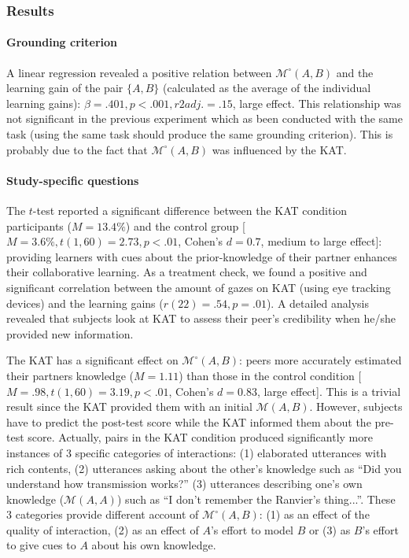 \documentclass[natbib]{svjour3}
\newcommand{\gmodel}[2]{{$\mathcal{M}(#1, #2)$}}
\newcommand{\gModel}[2]{{$\mathcal{M}^{\circ}(#1, #2)$}}
\begin{document}
\subsubsection*{Results}

\paragraph{Grounding criterion} A linear regression revealed a positive relation
between \gModel{A}{B} and the learning gain of the pair $\{A, B\}$ (calculated
as the average of the individual learning gains): $\beta= .401, p < .001, r2adj.
=.15$, large effect. This relationship was not significant in the previous
experiment which as been conducted with the same task (using the same task
should produce the same grounding criterion). This is probably due to the fact that
\gModel{A}{B} was influenced by the KAT.

\paragraph{Study-specific questions} The $t$-test reported a significant
difference between the KAT condition participants ($M = 13.4\%$) and the control
group [$M = 3.6\%, t(1, 60) = 2.73, p < .01$, Cohen's $d = 0.7$, medium to large
effect]: providing learners with cues about the prior-knowledge of their partner
enhances their collaborative learning. As a treatment check, we found a positive
and significant correlation between the amount of gazes on KAT (using eye
tracking devices) and the learning gains ($r(22) = .54, p = .01$). A detailed
analysis revealed that subjects look at KAT to assess their peer's credibility
when he/she provided new information. 

The KAT has a significant effect on \gModel{A}{B}: peers more accurately
estimated their partners knowledge ($M = 1.11$) than those in the control
condition [$M = .98, t(1, 60) = 3.19, p < .01$, Cohen's $d = 0.83$, large
effect]. This is a trivial result since the KAT provided them with an initial
\gmodel{A}{B}. However, subjects have to predict the post-test score while the
KAT informed them about the pre-test score. Actually, pairs in the KAT condition
produced significantly more instances of 3 specific categories of interactions:
(1) elaborated utterances with rich contents,  (2) utterances asking about the
other's knowledge such as ``Did you understand how transmission works?'' (3)
utterances describing one's own knowledge (\gmodel{A}{A}) such as ``I don't
remember the Ranvier's thing...''. These 3 categories provide different account
of \gModel{A}{B}: (1) as an effect of the quality of interaction, (2) as an
effect of $A$'s effort to model $B$ or (3) as $B$'s effort to give cues to $A$ about his
own knowledge.
\end{document}
